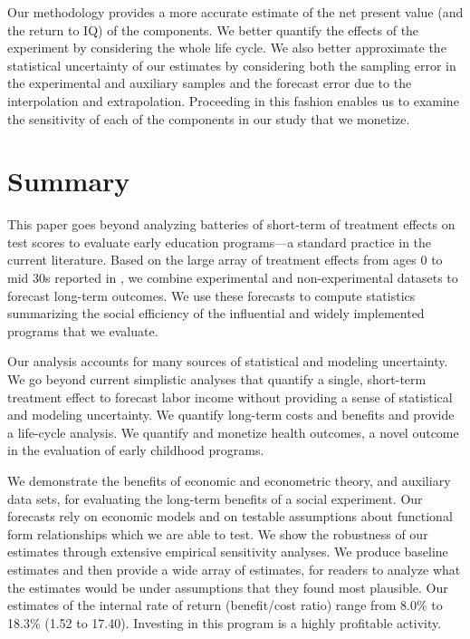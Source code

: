 Our methodology provides a more accurate estimate of the net present value (and the return to IQ) of the components. We better quantify the effects of the experiment by considering the whole life cycle. We also better approximate the statistical uncertainty of our estimates by considering both the sampling error in the experimental and auxiliary samples and the forecast error due to the interpolation and extrapolation. Proceeding in this fashion enables us to examine the sensitivity of each of the components in our study that we monetize.

\section{Summary} \label{section:conclusion}

This paper goes beyond analyzing batteries of short-term of treatment effects on test scores to evaluate early education programs---a standard practice in the current literature. Based on the large array of treatment effects from ages 0 to mid 30s reported in \citet{Garcia_Heckman_Ziff_2017_Gender-Diff_UNPUBLISHED}, we combine experimental and non-experimental datasets to forecast long-term outcomes. We use these forecasts to compute statistics summarizing the social efficiency of the influential and widely implemented programs that we evaluate.

Our analysis accounts for many sources of statistical and modeling uncertainty. We go beyond current simplistic analyses that quantify a single, short-term treatment effect to forecast labor income without providing a sense of statistical and modeling uncertainty. We quantify long-term costs and benefits and provide a life-cycle analysis. We quantify and monetize health outcomes, a novel outcome in the evaluation of early childhood programs.

We demonstrate the benefits of economic and econometric theory, and auxiliary data sets, for evaluating the long-term benefits of a social experiment. Our forecasts rely on economic models and on testable assumptions about functional form relationships which we are able to test. We show the robustness of our estimates through extensive empirical sensitivity analyses. We produce baseline estimates and then provide a wide array of estimates, for readers to analyze what the estimates would be under assumptions that they found most plausible. Our estimates of the internal rate of return (benefit/cost ratio) range from 8.0\% to 18.3\% (1.52 to 17.40). Investing in this program is a highly profitable activity.

\clearpage

\singlespace



 